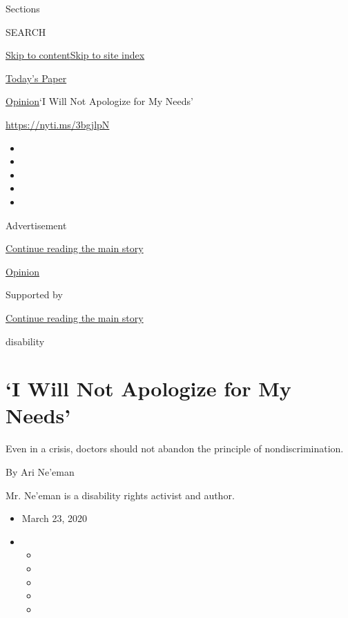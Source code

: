 Sections

SEARCH

\protect\hyperlink{site-content}{Skip to
content}\protect\hyperlink{site-index}{Skip to site index}

\href{https://myaccount.nytimes.com/auth/login?response_type=cookie\&client_id=vi}{}

\href{https://www.nytimes.com/section/todayspaper}{Today's Paper}

\href{/section/opinion}{Opinion}\textbar{}`I Will Not Apologize for My
Needs'

\href{https://nyti.ms/3bgjlpN}{https://nyti.ms/3bgjlpN}

\begin{itemize}
\item
\item
\item
\item
\item
\end{itemize}

Advertisement

\protect\hyperlink{after-top}{Continue reading the main story}

\href{/section/opinion}{Opinion}

Supported by

\protect\hyperlink{after-sponsor}{Continue reading the main story}

disability

\hypertarget{i-will-not-apologize-for-my-needs}{%
\section{`I Will Not Apologize for My
Needs'}\label{i-will-not-apologize-for-my-needs}}

Even in a crisis, doctors should not abandon the principle of
nondiscrimination.

By Ari Ne'eman

Mr. Ne'eman is a disability rights activist and author.

\begin{itemize}
\item
  March 23, 2020
\item
  \begin{itemize}
  \item
  \item
  \item
  \item
  \item
  \end{itemize}
\end{itemize}

